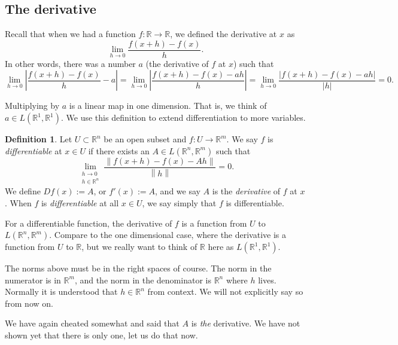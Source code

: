 \documentclass[12pt]{book}
\newcommand{\abs}[1]{\left\lvert {#1} \right\rvert}
\newcommand{\norm}[1]{\left\lVert {#1} \right\rVert}
\newcommand{\R}{{\mathbb{R}}}
\newcommand{\myindex}[1]{#1\index{#1}}
\theoremstyle{plain}
\theoremstyle{remark}
\theoremstyle{definition}
\newtheorem{defn}[thm]{Definition}
\theoremstyle{exercise}
\theoremstyle{example}
\begin{document}
\subsection{The derivative}

Recall that when we had a function $f \colon \R \to \R$, we defined
the derivative at $x$ as
\begin{equation*}
\lim_{h \to 0} \frac{f(x+h)-f(x)}{h} .
\end{equation*}
In other words, there was a number $a$ (the derivative of $f$ at $x$) such that
\begin{equation*}
\lim_{h \to 0} \abs{\frac{f(x+h)-f(x)}{h} - a} =
\lim_{h \to 0} \abs{\frac{f(x+h)-f(x) - ah}{h}}
=
\lim_{h \to 0} \frac{\abs{f(x+h)-f(x) - ah}}{\abs{h}}
= 0.
\end{equation*}

Multiplying by $a$ is a linear map in one dimension.  That is,
we think of $a \in L(\R^1,\R^1)$.  We use this definition
to extend differentiation to more variables.

\begin{defn}
Let $U \subset \R^n$ be an open subset and $f \colon U \to \R^m$.  We
say $f$ is \emph{\myindex{differentiable}} at $x \in U$ if there exists
an $A \in L(\R^n,\R^m)$ such that
\begin{equation*}
\lim_{\substack{h \to 0\\h\in \R^n}}
\frac{\norm{f(x+h)-f(x) - Ah}}{\norm{h}} = 0 .
\end{equation*}
We define $Df(x) := A$, or $f'(x) := A$, and
we say $A$ is the \emph{\myindex{derivative}} of $f$ at $x$.
When $f$ is \emph{differentiable} at
all $x \in U$, we say simply that $f$ is differentiable.
\end{defn}

For a differentiable function,
the derivative of $f$ is a function from $U$ to $L(\R^n,\R^m)$.  Compare
to the one dimensional case, where the derivative is a function
from $U$ to $\R$, but we really want to think of $\R$ here as
$L(\R^1,\R^1)$.

The norms above must be in the right spaces of course.  The norm in the
numerator is in $\R^m$, and the norm in the denominator is $\R^n$ where $h$
lives.
Normally it is 
understood that $h \in \R^n$ from context.
We will not explicitly say so from now on.

We have again cheated somewhat and said that $A$
is \emph{the} derivative.  We have not shown yet that there
is only one, let us do that now.
\end{document}
